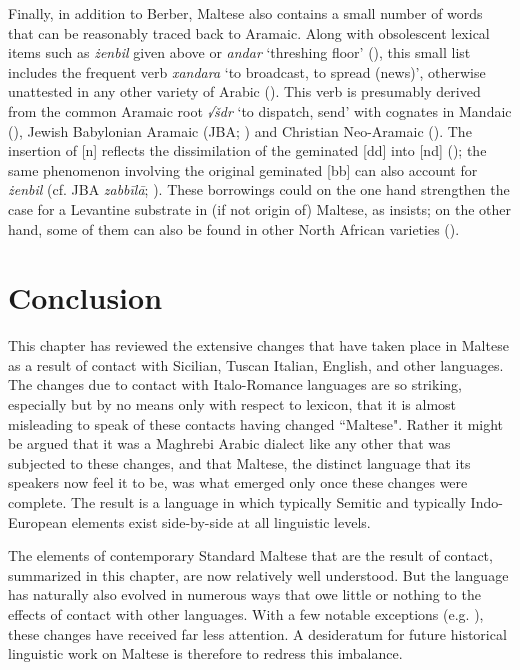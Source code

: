 \documentclass[output=paper]{langsci/langscibook}
\begin{document}
Finally, in addition to Berber, Maltese also contains a small number of words that can be reasonably traced back to Aramaic. Along with obsolescent lexical items such as \textit{żenbil} given above or \textit{andar} `threshing floor' (\citealt[116--117]{Behnstedt2005}), this small list includes the frequent verb \textit{xandara} `to broadcast, to spread (news)', otherwise unattested in any other variety of Arabic (\citealt[46]{Borg1996}). This verb is presumably derived from the common Aramaic root \textit{√šdr} `to dispatch, send' with cognates in Mandaic (\citealt[450]{manddic1963}), Jewish Babylonian Aramaic (JBA; \citealt[1112-1113]{sokoloff2002}) and Christian Neo-Aramaic (\citealt[1179]{Khan2008}). The insertion of [n] reflects the dissimilation of the geminated [dd] into [nd] (\citealt[175--176]{Lipinski1997}); the same phenomenon involving the original geminated [bb] can also account for \textit{żenbil} (cf. JBA \textit{zabbīlā}; \citealt[397]{sokoloff2002}). These borrowings could on the one hand strengthen the case for a Levantine substrate in (if not origin of) Maltese, as \cite{Borg1996} insists; on the other hand, some of them can also be found in other North African varieties (\citealt{Behnstedt2005}).

\section{Conclusion}
This chapter has reviewed the extensive changes that have taken place in Maltese as a result of contact with Sicilian, Tuscan Italian, English, and other languages. The changes due to contact with Italo-Romance languages are so striking, especially but by no means only with respect to lexicon, that it is almost misleading to speak of these contacts having changed ``Maltese". Rather it might be argued that it was a Maghrebi Arabic dialect like any other that was subjected to these changes, and that Maltese, the distinct language that its speakers now feel it to be, was what emerged only once these changes were complete. The result is a language in which typically Semitic and typically Indo-European elements exist side-by-side at all linguistic levels.

The elements of contemporary Standard Maltese that are the result of contact, summarized in this chapter, are now relatively well understood. But the language has naturally also evolved in numerous ways that owe little or nothing to the effects of contact with other languages. With a few notable exceptions (e.g. \citealt{Borg1978,Vanhove1993}), these changes have received far less attention. A desideratum for future historical linguistic work on Maltese is therefore to redress this imbalance.
\end{document}
